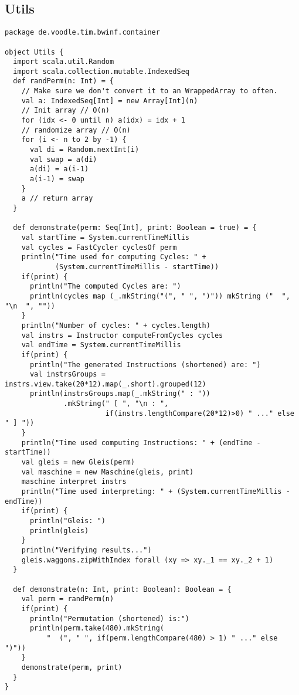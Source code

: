 \clearpage\subsection{Utils}
\begin{lstlisting}
package de.voodle.tim.bwinf.container

object Utils {
  import scala.util.Random
  import scala.collection.mutable.IndexedSeq
  def randPerm(n: Int) = {
    // Make sure we don't convert it to an WrappedArray to often.
    val a: IndexedSeq[Int] = new Array[Int](n)
    // Init array // O(n)
    for (idx <- 0 until n) a(idx) = idx + 1
    // randomize array // O(n)
    for (i <- n to 2 by -1) {
      val di = Random.nextInt(i)
      val swap = a(di)
      a(di) = a(i-1)
      a(i-1) = swap
    }
    a // return array
  }

  def demonstrate(perm: Seq[Int], print: Boolean = true) = {
    val startTime = System.currentTimeMillis
    val cycles = FastCycler cyclesOf perm
    println("Time used for computing Cycles: " +
            (System.currentTimeMillis - startTime))
    if(print) {
      println("The computed Cycles are: ")
      println(cycles map (_.mkString("(", " ", ")")) mkString ("  ", "\n  ", ""))
    }
    println("Number of cycles: " + cycles.length)
    val instrs = Instructor computeFromCycles cycles
    val endTime = System.currentTimeMillis
    if(print) {
      println("The generated Instructions (shortened) are: ")
      val instrsGroups = instrs.view.take(20*12).map(_.short).grouped(12)
      println(instrsGroups.map(_.mkString(" : "))
              .mkString(" [ ", "\n : ",
                        if(instrs.lengthCompare(20*12)>0) " ..." else " ] "))
    }
    println("Time used computing Instructions: " + (endTime - startTime))
    val gleis = new Gleis(perm)
    val maschine = new Maschine(gleis, print)
    maschine interpret instrs
    println("Time used interpreting: " + (System.currentTimeMillis - endTime))
    if(print) {
      println("Gleis: ")
      println(gleis)
    }
    println("Verifying results...")
    gleis.waggons.zipWithIndex forall (xy => xy._1 == xy._2 + 1)
  }

  def demonstrate(n: Int, print: Boolean): Boolean = {
    val perm = randPerm(n)
    if(print) {
      println("Permutation (shortened) is:")
      println(perm.take(480).mkString(
          "  (", " ", if(perm.lengthCompare(480) > 1) " ..." else ")"))
    }
    demonstrate(perm, print)
  }
}
\end{lstlisting}

